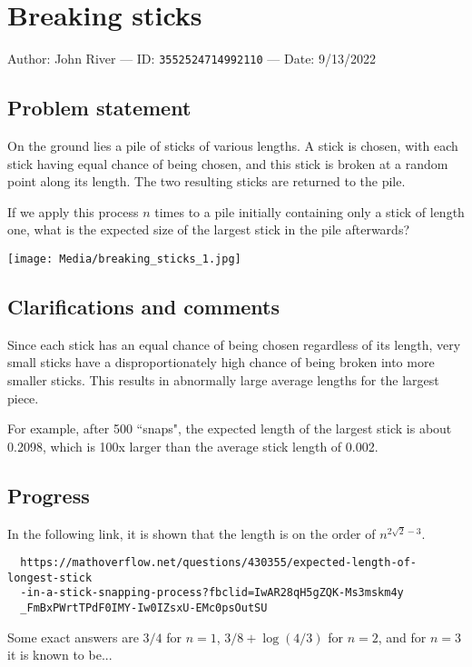 
\section{Breaking sticks}

Author: John River --- ID: \verb`3552524714992110` --- Date: 9/13/2022

\subsection{Problem statement}

On the ground lies a pile of sticks of various lengths. A stick is chosen, with each stick having equal chance of being chosen, and this stick is broken at a random point along its length. The two resulting sticks are returned to the pile.

If we apply this process $n$ times to a pile initially containing only a stick of length one, what is the expected size of the largest stick in the pile afterwards?

\texttt{[image: Media/breaking\_sticks\_1.jpg]}

\subsection{Clarifications and comments}

Since each stick has an equal chance of being chosen regardless of its length, very small sticks have a disproportionately high chance of being broken into more smaller sticks. This results in abnormally large average lengths for the largest piece.

For example, after 500 ``snaps", the expected length of the largest stick is about 0.2098, which is 100x larger than the average stick length of 0.002.

\subsection{Progress}

In the following link, it is shown that the length is on the order of $n^{2\sqrt2-3}$.

\begin{verbatim}
  https://mathoverflow.net/questions/430355/expected-length-of-longest-stick
  -in-a-stick-snapping-process?fbclid=IwAR28qH5gZQK-Ms3mskm4y
  _FmBxPWrtTPdF0IMY-Iw0IZsxU-EMc0psOutSU
\end{verbatim}

Some exact answers are $3/4$ for $n=1$, $3/8+\log(4/3)$ for $n=2$, and for $n=3$ it is known to be...

